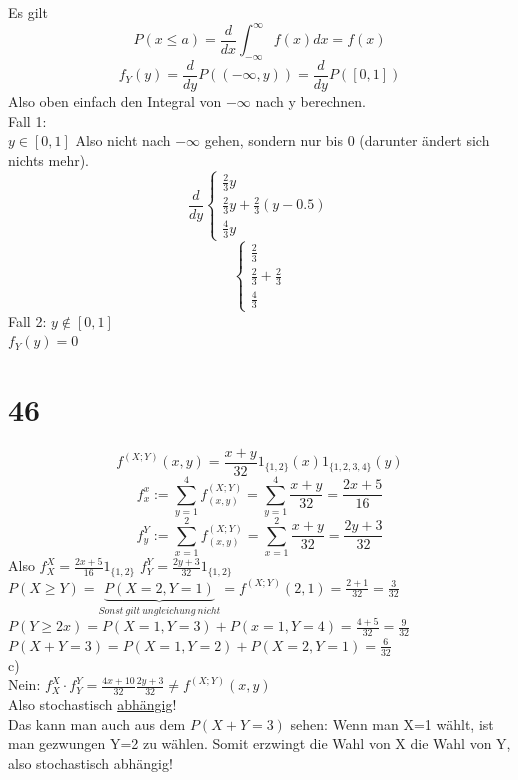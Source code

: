 \documentclass{article}
\begin{document}
	Es gilt
	\[P(x\leq a)=\frac{d}{dx}\int^{\infty}_{-\infty} f(x)dx=f(x)\]
	\[f_Y(y) = \frac{d}{dy}P((-\infty,y)) = \frac{d}{dy}P([0,1])\]
	Also oben einfach den Integral von $-\infty$ nach y berechnen.\\
	Fall 1:\\
	$y\in[0,1]$ Also nicht nach $-\infty$ gehen, sondern nur bis 0 (darunter ändert sich nichts mehr).\\
	\[\frac{d}{dy} \begin{cases}\frac{2}{3} y\\ \frac{2}{3}y+\frac{2}{3}(y-0.5)\\ \frac{4}{3}y\end{cases}\]
	\[\begin{cases}\frac{2}{3}\\ \frac{2}{3}+\frac{2}{3}\\ \frac{4}{3}\end{cases}\]
	Fall 2: $y\notin [0,1]$\\
	$f_Y(y)=0$\\
	\section{46}
	\[f^{(X;Y)} (x,y)=\frac{x+y}{32}1_{\{1,2\}}(x)1_{\{1,2,3,4\}}(y)\]
	\[f_x^x:= \sum^4_{y=1}f^{(X;Y)}_{(x,y)} = \sum^4_{y=1} \frac{x+y}{32} = \frac{2x+5}{16}\]
	\[f_y^Y:= \sum^2_{x=1}f^{(X;Y)}_{(x,y)} = \sum^2_{x=1} \frac{x+y}{32} = \frac{2y+3}{32}\]
	Also $f_X^X=\frac{2x+5}{16}1_{\{1,2\}}$ $f^Y_Y = \frac{2y+3}{32}1_{\{1,2\}}$\\
	$P(X\geq Y) = \underbrace{P(X=2,Y=1)}_{Sonst\ gilt\ ungleichung\ nicht} = f^{(X;Y)} (2,1) = \frac{2+1}{32} = \frac{3}{32}$\\
	$P(Y\geq 2x)=P(X=1,Y=3)+P(x=1, Y=4) = \frac{4+5}{32}=\frac{9}{32}$
	$P(X+Y=3)= P(X=1,Y=2)+P(X=2,Y=1) = \frac{6}{32}$\\
	c)\\
	Nein: $f_X^X\cdot f_Y^Y=\frac{4x+10}{32}\frac{2y+3}{32} \neq f^{(X;Y)} (x,y)$\\
	Also stochastisch \underline{abhängig}!\\
	Das kann man auch aus dem $P(X+Y=3)$ sehen: Wenn man X=1 wählt, ist man gezwungen Y=2 zu wählen. Somit erzwingt die Wahl von X die Wahl von Y, also stochastisch abhängig!
\end{document}
